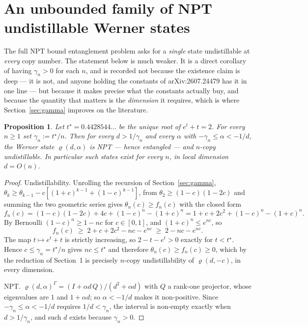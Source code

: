 \documentclass[11pt]{article}
\theoremstyle{definition}
\theoremstyle{plain}
\newtheorem{proposition}{Proposition}
\begin{document}
\section{An unbounded family of NPT undistillable Werner states}
\label{sec:existence}

The full NPT bound entanglement problem asks for a \emph{single} state undistillable at
\emph{every} copy number. The statement below is much weaker. It is a direct corollary of
having $\gamma_n>0$ for each $n$, and is recorded not because the existence claim is deep
--- it is not, and anyone holding the constants of arXiv:2607.24479 has it in one line ---
but because it makes precise what the constants actually buy, and because the quantity that
matters is the \emph{dimension} it requires, which is where Section~\ref{sec:gamma}
improves on the literature.

\begin{proposition}
\label{thm:existence}
Let $t^\star=0.4428544\ldots$ be the unique root of $e^t+t=2$. For every $n\ge1$ set
$\gamma_n:=t^\star/n$. Then for every $d>1/\gamma_n$ and every $\alpha$ with
$-\gamma_n\le\alpha<-1/d$, the Werner state $\varrho(d,\alpha)$ is NPT --- hence entangled
--- and $n$-copy undistillable. In particular such states exist for every $n$, in local
dimension $d=O(n)$.
\end{proposition}

\begin{proof}
Undistillability. Unrolling the recursion of Section~\ref{sec:gamma},
$\theta_k\ge\theta_{k-1}-c[(1+c)^{k-1}+(1-c)^{k-1}]$, from $\theta_2\ge(1-c)(1-2c)$ and
summing the two geometric series gives $\theta_n(c)\ge f_n(c)$ with the closed form
\[
f_n(c)=(1-c)(1-2c)+4c+(1-c)^n-(1+c)^n=1+c+2c^2+(1-c)^n-(1+c)^n .
\]
By Bernoulli $(1-c)^n\ge1-nc$ for $c\in[0,1]$, and $(1+c)^n\le e^{nc}$, so
\[
f_n(c)\;\ge\;2+c+2c^2-nc-e^{nc}\;\ge\;2-nc-e^{nc}.
\]
The map $t\mapsto e^t+t$ is strictly increasing, so $2-t-e^{t}>0$ exactly for $t<t^\star$.
Hence $c\le\gamma_n=t^\star/n$ gives $nc\le t^\star$ and therefore $\theta_n(c)\ge f_n(c)\ge0$,
which by the reduction of Section~1 is precisely $n$-copy undistillability of
$\varrho(d,-c)$, in every dimension.

NPT. $\varrho(d,\alpha)^\Gamma=(I+\alpha d\,Q)/(d^2+\alpha d)$ with $Q$ a rank-one
projector, whose eigenvalues are $1$ and $1+\alpha d$; so $\alpha<-1/d$ makes it
non-positive. Since $-\gamma_n\le\alpha<-1/d$ requires $1/d<\gamma_n$, the interval is
non-empty exactly when $d>1/\gamma_n$, and such $d$ exists because $\gamma_n>0$.
\end{proof}
\end{document}
